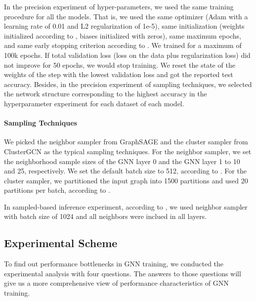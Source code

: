 In the precision experiment of hyper-parameters, we used the same training procedure for all the models. 
%
That is, we used the same optimizer (Adam \cite{diederik2015_adam} with a learning rate of 0.01 and L2 regularization of 1e-5), 
same initialization (weights initialized according to \cite{xavier2010_glorot}, biases initialized with zeros), same maximum epochs, and same early stopping criterion according to \cite{shchur2018_pitfall_of_gnn}. 
%
We trained for a maximum of 100k epochs. 
%
If total validation loss (loss on the data plus regularization loss) did not improve for 50 epochs, we would stop training. 
%
We reset the state of the weights of the step with the lowest validation loss and got the reported test accuracy.
%
Besides, in the precision experiment of sampling techniques, we selected the network structure corresponding to the highest accuracy in the hyperparameter experiment for each dataset of each model.

\paragraph{Sampling Techniques}

We picked the neighbor sampler from GraphSAGE \cite{hamilton2017_graphsage} and the cluster sampler from ClusterGCN \cite{chiang2019_cluster_gcn} as the typical sampling techniques.
%
For the neighbor sampler, we set the neighborhood sample sizes of the GNN layer 0 and the GNN layer 1 to 10 and 25, respectively.
%
We set the default batch size to 512, according to \cite{hamilton2017_graphsage}.
%
For the cluster sampler, we partitioned the input graph into 1500 partitions and used 20 partitions per batch, according to \cite{chiang2019_cluster_gcn}.

In sampled-based inference experiment, according to \cite{weihua2020_ogb-benchmark}, we used neighbor sampler \cite{hamilton2017_graphsage} with batch size of 1024 and all neighbors were inclued in all layers.

\subsection{Experimental Scheme}
\label{sec:experimental_scheme}

To find out performance bottlenecks in GNN training, we conducted the experimental analysis with four questions.
%
The answers to those questions will give us a more comprehensive view of performance characteristics of GNN training.

